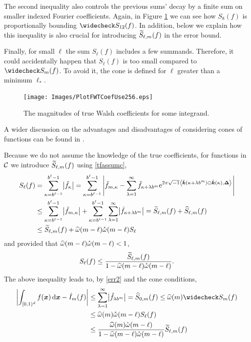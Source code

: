 \documentclass[graybox,footinfo]{svmult}
\newcommand{\bsx}{\boldsymbol{x}}    %
\newcommand{\bsDelta}{\boldsymbol{\Delta}}    %
\begin{document}
The second inequality also controls the previous sums' decay by a finite sum on smaller indexed Fourier coefficients. Again, in Figure \ref{Walshcoeffig} we can see how $S_8(f)$ is proportionally bounding $\wcS_{12}(f)$. In addition, below we explain how this inequality is also crucial for introducing $\widetilde{S}_{\ell,m}(f)$ in the error bound.

Finally, for small $\ell$ the sum $S_\ell(f)$ includes a few summands. Therefore, it could accidentally happen that $S_\ell(f)$ is too small compared to $\wcS_m(f)$. To avoid it, the cone is defined for $\ell$ greater than a minimum $\ell_*$.

\begin{figure}
\centering
\texttt{[image: Images/PlotFWTCoefUse256.eps]}
\caption{The magnitudes of true Walsh coefficients for some integrand. \label{Walshcoeffig}}
\end{figure}

A wider discussion on the advantages and disadvantages of considering cones of functions can be found in \cite{Clancy201421}.

Because we do not assume the knowledge of the true coefficients, for functions in $\mathcal{C}$ we introduce $\widetilde{S}_{\ell,m}(f)$ using \eqref{tfassumc},
\begin{align*}
S_\ell(f) &= \sum_{\kappa=b^{\ell-1}}^{b^{\ell}-1} \bigl \lvert \hf_{\kappa}\bigr\rvert= \sum_{\kappa=b^{\ell-1}}^{b^{\ell}-1} \abs{\tf_{m,\kappa} - \sum_{\lambda=1}^{\infty} \hf_{\kappa+\lambda b^{m}} \me^{2 \pi \sqrt{-1} \ip{\tvk(\kappa+\lambda b^{m}) \ominus \tvk(\kappa)}{\bsDelta}}}\\
&\le \sum_{\kappa=b^{\ell-1}}^{b^{\ell}-1} \bigl \lvert \tf_{m,\kappa} \bigr\rvert + \sum_{\kappa=b^{\ell-1}}^{b^{\ell}-1} \sum_{\lambda=1}^{\infty} \bigl \lvert \hf_{\kappa+\lambda b^{m}}\bigr\rvert = \tS_{\ell,m}(f) + \hS_{\ell,m}(f) \\
&\le \tS_{\ell,m}(f) + \homega(m-\ell) \wcomega(m-\ell) S_\ell
\end{align*}
and provided that $\widehat{\omega}(m-\ell) \mathring{\omega}(m-\ell)<1$,
\begin{equation}
S_\ell(f) \le \frac{\widetilde{S}_{\ell,m}(f)}{1 - \widehat{\omega}(m-\ell) \mathring{\omega}(m-\ell)}.
\end{equation}
The above inequality leads to, by \eqref{err2} and the cone conditions,
\begin{align}
\nonumber
\biggabs{\int_{\cube} f(\bsx) \, \D \bsx - \hI_m(f) }
&\le \sum_{\lambda=1}^{\infty} \bigabs{\hf_{\lambda b^{m}}} 
= \hS_{0,m}(f)\le \homega(m) \wcS_m(f)\\
\nonumber
&  \le \homega(m) \wcomega(m-\ell) S_\ell(f)\\
& \le  \frac{\homega(m) \wcomega(m-\ell)}{1 - \homega(m-\ell) \wcomega(m-\ell)}\tS_{\ell,m}(f)
\label{SSbd2}
\end{align}
\end{document}

